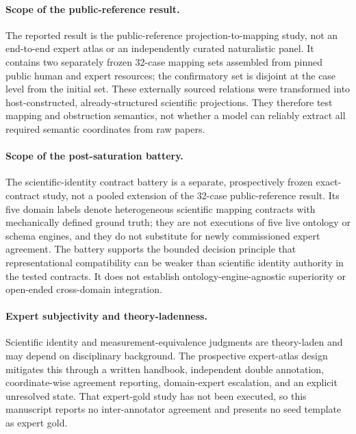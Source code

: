 \paragraph{Scope of the public-reference result.}
The reported result is the public-reference projection-to-mapping study, not
an end-to-end expert atlas or an independently curated naturalistic panel. It
contains two separately frozen
32-case mapping sets assembled from pinned public human and expert resources;
the confirmatory set is disjoint at the case level from the initial set. These
externally sourced relations were transformed into host-constructed,
already-structured scientific projections. They therefore test
mapping and obstruction semantics, not whether a model can reliably extract
all required semantic coordinates from raw papers.

\paragraph{Scope of the post-saturation battery.}
The scientific-identity contract battery is a separate, prospectively frozen
exact-contract study, not a pooled extension of the 32-case public-reference
result. Its five domain labels denote heterogeneous scientific mapping
contracts with mechanically defined ground truth; they are not executions of
five live ontology or schema engines, and they do not substitute for newly
commissioned expert agreement. The battery supports the bounded decision
principle that representational compatibility can be weaker than scientific
identity authority in the tested contracts. It does not establish
ontology-engine-agnostic superiority or open-ended cross-domain integration.

\paragraph{Expert subjectivity and theory-ladenness.}
Scientific identity and measurement-equivalence judgments are theory-laden and
may depend on disciplinary background. The prospective expert-atlas design
mitigates this through a written handbook, independent double annotation,
coordinate-wise agreement reporting, domain-expert escalation, and an explicit
unresolved state. That expert-gold study has not been executed, so this
manuscript reports no inter-annotator agreement and presents no seed template
as expert gold.

